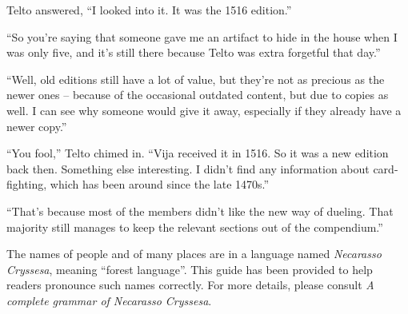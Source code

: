 Telto answered, ``I looked into it. It was the 1516 edition.''

``So you're saying that someone gave me an artifact to hide in the house when I was only five, and it's still there because Telto was extra forgetful that day.''

``Well, old editions still have a lot of value, but they're not as precious as the newer ones -- because of the occasional outdated content, but due to copies as well. I can see why someone would give it away, especially if they already have a newer copy.''

``You fool,'' Telto chimed in. ``Vija received it in 1516. So it was a new edition back then. Something else interesting. I didn't find any information about card-fighting, which has been around since the late 1470s.''

``That's because most of the members didn't like the new way of dueling. That majority still manages to keep the relevant sections out of the compendium.''

\appendix
\showappendices


The names of people and of many places are in a language named \emph{Necarasso Cryssesa}, meaning ``forest language''. This guide has been provided to help readers pronounce such names correctly. For more details, please consult \emph{A complete grammar of Necarasso Cryssesa}.

